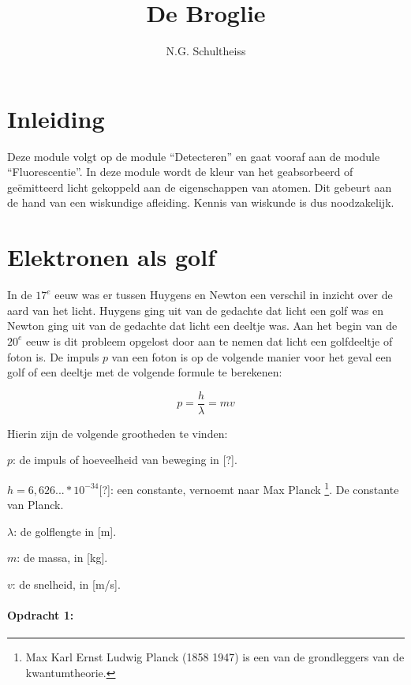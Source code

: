 



\title{De Broglie}
\author{N.G. Schultheiss}
\date{}

\maketitle
\thispagestyle{firststyle}

\section{Inleiding}

Deze module volgt op de module ``Detecteren'' en gaat vooraf aan
de module ``Fluorescentie''. In deze module wordt de kleur van het
geabsorbeerd of geëmitteerd licht gekoppeld aan de eigenschappen van
atomen. Dit gebeurt aan de hand van een wiskundige afleiding. Kennis
van wiskunde is dus noodzakelijk.


\section{Elektronen als golf}

In de $17^{e}$ eeuw was er tussen Huygens en Newton een verschil
in inzicht over de aard van het licht. Huygens ging uit van de gedachte
dat licht een golf was en Newton ging uit van de gedachte dat licht
een deeltje was. Aan het begin van de $20^{e}$ eeuw is dit probleem
opgelost door aan te nemen dat licht een golfdeeltje of foton is.
De impuls $p$ van een foton is op de volgende manier voor het geval
een golf of een deeltje met de volgende formule te berekenen:

\begin{equation}
p=\frac{h}{\lambda}=mv
\end{equation}


Hierin zijn de volgende grootheden te vinden:

$p$: de impuls of hoeveelheid van beweging in {[}?{]}.

$h=6,626...*10^{-34}${[}?{]}: een constante, vernoemt naar Max Planck
\footnote{Max Karl Ernst Ludwig Planck (1858 \textendash{} 1947) is een
van de grondleggers van de kwantumtheorie.}. De constante van Planck.

$\lambda$: de golflengte in {[}m{]}.

$m$: de massa, in {[}kg{]}.

$v$: de snelheid, in {[}m/s{]}.


\paragraph*{Opdracht 1:}

